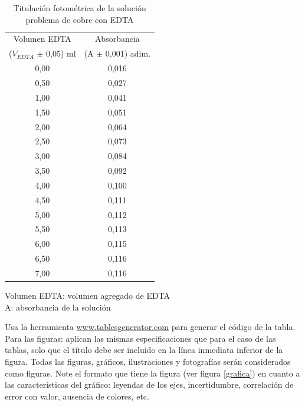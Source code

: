 \documentclass[12pt,letterpaper,twocolumn,twoside]{article}
\begin{document}
\begin{table}[htb]
\centering
\footnotesize
\caption{Titulación fotométrica de la solución problema de cobre con EDTA}
\label{tab:tabla1}
\begin{tabular}{c|c}
Volumen EDTA                & Absorbancia           \\
($V_{EDTA}$ $\pm$  0,05) ml & (A $\pm$ 0,001) adim. \\ \hline
0,00                        & 0,016                 \\
0,50                        & 0,027                 \\
1,00                        & 0,041                 \\
1,50                        & 0,051                 \\
2,00                        & 0,064                 \\
2,50                        & 0,073                 \\
3,00                        & 0,084                 \\
3,50                        & 0,092                 \\
4,00                        & 0,100                 \\
4,50                        & 0,111                 \\
5,00                        & 0,112                 \\
5,50                        & 0,113                 \\
6,00                        & 0,115                 \\
6,50                        & 0,116                 \\
7,00                        & 0,116 \\\hline               
\end{tabular}

\raggedright
Volumen EDTA: volumen agregado de EDTA\\
A: absorbancia de la solución
\end{table}

Usa la herramienta \url{www.tablesgenerator.com} para generar el código de la tabla.
Para las figuras: aplican las mismas especificaciones que para el caso de las tablas, solo que el título debe ser incluido en la línea inmediata inferior de la figura. Todas las figuras, gráficos, ilustraciones y fotografías serán considerados como figuras. Note el formato que tiene la figura (ver figura \ref{grafica}) en cuanto a las características del gráfico: leyendas de los ejes, incertidumbre, correlación de error con valor, ausencia de colores, etc.
\end{document}
